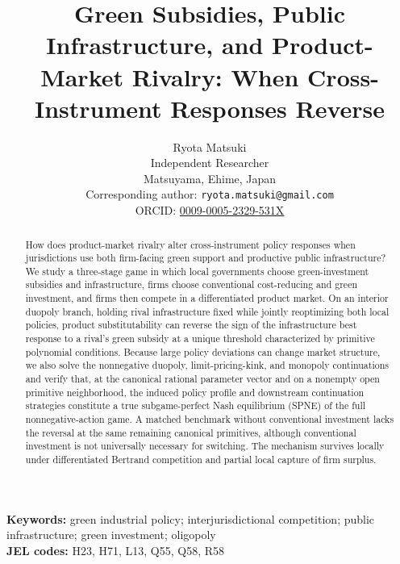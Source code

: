 \documentclass[11pt]{article}
\title{Green Subsidies, Public Infrastructure, and Product-Market Rivalry: When Cross-Instrument Responses Reverse}
\author{Ryota Matsuki\\
Independent Researcher\\
Matsuyama, Ehime, Japan\\
Corresponding author: \texttt{ryota.matsuki@gmail.com}\\
ORCID: \href{https://orcid.org/0009-0005-2329-531X}{0009-0005-2329-531X}}
\date{}
\begin{document}
\maketitle
\begingroup
\renewcommand{\thefootnote}{}
\endgroup

\begin{abstract}
How does product-market rivalry alter cross-instrument policy responses when jurisdictions use both firm-facing green support and productive public infrastructure? We study a three-stage game in which local governments choose green-investment subsidies and infrastructure, firms choose conventional cost-reducing and green investment, and firms then compete in a differentiated product market. On an interior duopoly branch, holding rival infrastructure fixed while jointly reoptimizing both local policies, product substitutability can reverse the sign of the infrastructure best response to a rival's green subsidy at a unique threshold characterized by primitive polynomial conditions. Because large policy deviations can change market structure, we also solve the nonnegative duopoly, limit-pricing-kink, and monopoly continuations and verify that, at the canonical rational parameter vector and on a nonempty open primitive neighborhood, the induced policy profile and downstream continuation strategies constitute a true subgame-perfect Nash equilibrium (SPNE) of the full nonnegative-action game. A matched benchmark without conventional investment lacks the reversal at the same remaining canonical primitives, although conventional investment is not universally necessary for switching. The mechanism survives locally under differentiated Bertrand competition and partial local capture of firm surplus.
\end{abstract}

\noindent\textbf{Keywords:} green industrial policy; interjurisdictional competition; public infrastructure; green investment; oligopoly\\
\textbf{JEL codes:} H23, H71, L13, Q55, Q58, R58


















\end{document}
